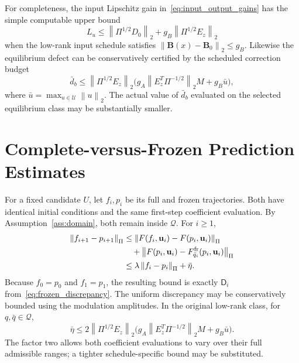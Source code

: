 \documentclass[journal]{IEEEtran}
\theoremstyle{plain}
\theoremstyle{definition}
\newcommand{\vu}{\mathbf{u}}
\newcommand{\mB}{\mathbf{B}}
\newcommand{\norm}[1]{\left\lVert #1\right\rVert}
\begin{document}
For completeness, the input Lipschitz gain in~\eqref{eq:input_output_gains} has the simple computable upper bound
\begin{equation}
L_u\le\norm{\Pi^{1/2}D_0}_2+g_B\norm{\Pi^{1/2}E_z}_2
\label{eq:input_gain_budget}
\end{equation}
when the low-rank input schedule satisfies $\norm{\mB(x)-\mB_0}_2\le g_B$. Likewise the equilibrium defect can be conservatively certified by the scheduled correction budget
\begin{equation}
\bar d_b\le \norm{\Pi^{1/2}E_z}_2
\bigl(g_A\norm{E_z^T\Pi^{-1/2}}_2M+g_B\bar u\bigr),
\label{eq:equilibrium_defect_budget}
\end{equation}
where $\bar u=\max_{u\in\mathcal U}\norm{u}_2$. The actual value of $\bar d_b$ evaluated on the selected equilibrium class may be substantially smaller.

\section{Complete-versus-Frozen Prediction Estimates}
\label{app:comparison}
For a fixed candidate $U$, let $f_i,p_i$ be its full and frozen trajectories. Both have identical initial conditions and the same first-step coefficient evaluation. By Assumption~\ref{ass:domain}, both remain inside $\mathcal Q$. For $i\ge1$,
\begin{equation}
\begin{split}
\norm{f_{i+1}-p_{i+1}}_\Pi
&\le\norm{F(f_i,\vu_i)-F(p_i,\vu_i)}_\Pi\\
&\quad+\norm{F(p_i,\vu_i)-F_{\bar q_i}^{\rm fr}(p_i,\vu_i)}_\Pi\\
&\le\lambda\norm{f_i-p_i}_\Pi+\bar\eta.
\end{split}
\label{eq:full_frozen_recursion}
\end{equation}
Because $f_0=p_0$ and $f_1=p_1$, the resulting bound is exactly $\mathsf D_i$ from~\eqref{eq:frozen_discrepancy}. The uniform discrepancy may be conservatively bounded using the modulation amplitudes. In the original low-rank class, for $q,\bar q\in\mathcal Q$,
\begin{equation}
\bar\eta\le2\norm{\Pi^{1/2}E_z}_2\bigl(
 g_A\norm{E_z^T\Pi^{-1/2}}_2M+g_B\bar u\bigr).
\label{eq:freeze_amplitude_budget}
\end{equation}
The factor two allows both coefficient evaluations to vary over their full admissible ranges; a tighter schedule-specific bound may be substituted.
\end{document}
